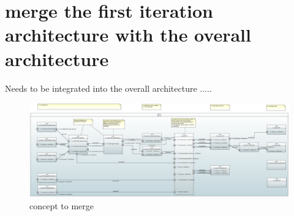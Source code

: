 \documentclass{template/openetcs_report}
\begin{document}
 \newpage
  \chapter{merge the first iteration architecture with the overall architecture}
 Needs to be integrated into the overall architecture .....
  \begin{figure}[hbtp]
\centering
\includegraphics [angle=90, scale=0.3]{images/architecture-db}
\caption{concept to merge}
\end{figure}
 



\newpage
\end{document}
